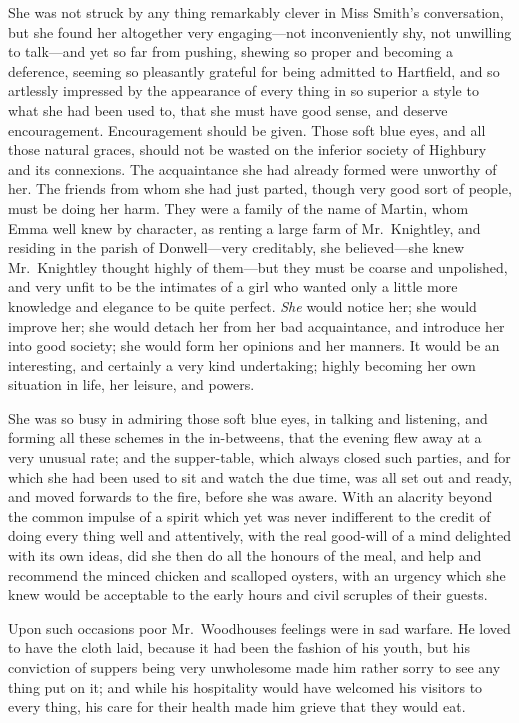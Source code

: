 She was not struck by any thing remarkably clever in Miss Smith's
conversation, but she found her altogether very engaging---not
inconveniently shy, not unwilling to talk---and yet so far from pushing,
shewing so proper and becoming a deference, seeming so pleasantly
grateful for being admitted to Hartfield, and so artlessly
impressed by the appearance of every thing in so superior a style
to what she had been used to, that she must have good sense,
and deserve encouragement.  Encouragement should be given.
Those soft blue eyes, and all those natural graces, should not be
wasted on the inferior society of Highbury and its connexions.
The acquaintance she had already formed were unworthy of her.
The friends from whom she had just parted, though very good sort
of people, must be doing her harm.  They were a family of the name
of Martin, whom Emma well knew by character, as renting a large farm
of Mr.\ Knightley, and residing in the parish of Donwell---very creditably,
she believed---she knew Mr.\ Knightley thought highly of them---but they
must be coarse and unpolished, and very unfit to be the intimates
of a girl who wanted only a little more knowledge and elegance
to be quite perfect.  \emph{She} would notice her; she would improve her;
she would detach her from her bad acquaintance, and introduce her
into good society; she would form her opinions and her manners.
It would be an interesting, and certainly a very kind undertaking;
highly becoming her own situation in life, her leisure, and powers.

She was so busy in admiring those soft blue eyes, in talking
and listening, and forming all these schemes in the in-betweens, that
the evening flew away at a very unusual rate; and the supper-table,
which always closed such parties, and for which she had been
used to sit and watch the due time, was all set out and ready,
and moved forwards to the fire, before she was aware.  With an
alacrity beyond the common impulse of a spirit which yet was never
indifferent to the credit of doing every thing well and attentively,
with the real good-will of a mind delighted with its own ideas,
did she then do all the honours of the meal, and help and recommend
the minced chicken and scalloped oysters, with an urgency which she
knew would be acceptable to the early hours and civil scruples of their guests.

Upon such occasions poor Mr.\ Woodhouses feelings were in sad warfare.
He loved to have the cloth laid, because it had been the fashion
of his youth, but his conviction of suppers being very unwholesome
made him rather sorry to see any thing put on it; and while his
hospitality would have welcomed his visitors to every thing,
his care for their health made him grieve that they would eat.

